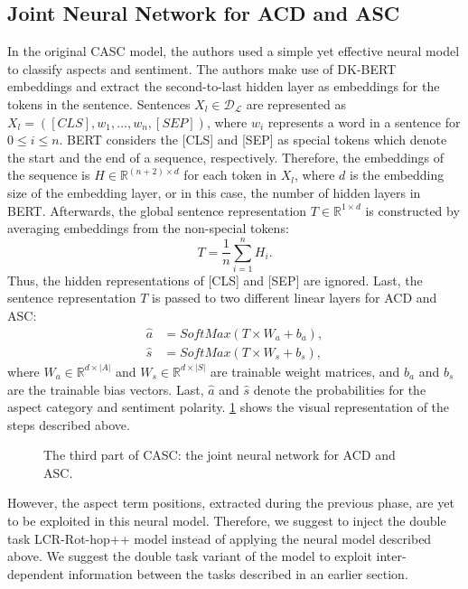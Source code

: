 \documentclass[american, oneside]{ecsgdp}
\begin{document}
\subsection{Joint Neural Network for ACD and ASC} %
In the original CASC model, the authors used a simple yet effective neural model to classify aspects and sentiment. The authors make use of DK-BERT embeddings and extract the second-to-last hidden layer as embeddings for the tokens in the sentence. Sentences $X_l \in \mathcal{D_\mathcal{L}}$ are represented as $X_l = \left ( [CLS], w_1, \ldots, w_n, [SEP] \right )$, where $w_i$ represents a word in a sentence for $0 \leq i \leq n$. BERT considers the [CLS] and [SEP] as special tokens which denote the start and the end of a sequence, respectively. Therefore, the embeddings of the sequence is $H \in \mathbb{R}^{(n+2) \times d}$ for each token in $X_l$, where $d$ is the embedding size of the embedding layer, or in this case, the number of hidden layers in BERT. Afterwards, the global sentence representation $T \in \mathbb{R}^{1 \times d}$ is constructed by averaging embeddings from the non-special tokens: 
\begin{equation} 
    T = \frac{1}{n} \sum_{i=1}^{n}H_i. 
\end{equation}
Thus, the hidden representations of [CLS] and [SEP] are ignored. Last, the sentence representation $T$ is passed to two different linear layers for ACD and ASC: 
\begin{align}
    \hat{a} & = SoftMax(T \times W_a + b_a), \\
    \hat{s} & = SoftMax(T \times W_s + b_s),
\end{align}
where $W_a \in \mathbb{R}^{d \times \lvert A \rvert}$ and $W_s \in \mathbb{R}^{d \times \lvert S \rvert}$ are trainable weight matrices, and $b_a$ and $b_s$ are the trainable bias vectors. Last, $\hat{a}$ and  $\hat{s}$ denote the probabilities for the aspect category and sentiment polarity. \cref{fig:simple_neural} shows the visual representation of the steps described above.
  

\begin{figure}[htbp]
  \centering
  
  \caption{The third part of CASC: the joint neural network for ACD and ASC.}
  \label{fig:simple_neural}
\end{figure}

However, the aspect term positions, extracted during the previous phase, are yet to be exploited in this neural model. Therefore, we suggest to inject the double task LCR-Rot-hop++ model instead of applying the neural model described above. We suggest the double task variant of the model to exploit inter-dependent information between the tasks described in an earlier section.
\end{document}
